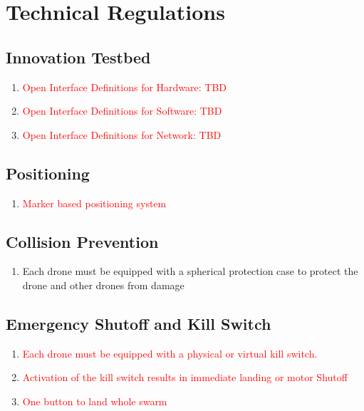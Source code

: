 \section{Technical Regulations}

\subsection{Innovation Testbed}
\begin{enumerate}
	\item{\textcolor{red}{Open Interface Definitions for Hardware: TBD}}
	\item{\textcolor{red}{Open Interface Definitions for Software: TBD}}
	\item{\textcolor{red}{Open Interface Definitions for Network: TBD}}
\end{enumerate}

\subsection{Positioning}
\begin{enumerate}
	\item{\textcolor{red}{Marker based positioning system}}

\end{enumerate}

\subsection{Collision Prevention}
\begin{enumerate}
	\item{Each drone must be equipped with a spherical protection case to protect the drone and other drones from damage}
\end{enumerate}

\subsection{Emergency Shutoff and Kill Switch}
\begin{enumerate}
	\item{\textcolor{red}{Each drone must be equipped with a physical or virtual kill switch.}}
	\item{\textcolor{red}{Activation of the kill switch results in immediate landing or motor Shutoff}}
	\item{\textcolor{red}{One button to land whole swarm}}
\end{enumerate}

